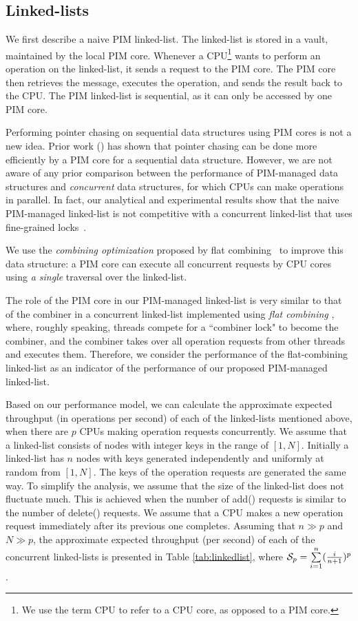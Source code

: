 \subsection{Linked-lists}
\label{section:linked_list}
We first describe a naive PIM linked-list.
The linked-list is stored in a vault, maintained by the local PIM core.
Whenever a CPU\footnote{We use the term CPU to refer to a CPU core, as opposed to a PIM core.} 
wants to perform an operation on the linked-list,
it sends a request to the PIM core.
The PIM core then retrieves the message, executes the operation, and sends the result back to the CPU.
The PIM linked-list is sequential, as it can only be accessed by one PIM core. 

Performing pointer chasing on sequential data structures using PIM cores is not a new idea. 
Prior work (\cite{hsieh2016accelerating, Ahn2015:2, Hashemi:2016}) has shown that 
pointer chasing can be done more efficiently by a PIM core for a sequential data structure.
However, we are not aware of any prior comparison between the performance of
PIM-managed data structures and \emph{concurrent} data structures, 
for which CPUs can make operations in parallel.
In fact, our analytical and experimental results show that 
the naive PIM-managed linked-list is not competitive with 
a concurrent linked-list that uses fine-grained locks~\cite{Heller05}.

We use the \textit{combining optimization} proposed by 
flat combining~\cite{Hendler10} to improve this data structure:
a PIM core can execute all concurrent requests by CPU cores using \emph{a single} 
traversal over the linked-list. 

The role of the PIM core in our PIM-managed linked-list
is very similar to that of the combiner in a concurrent linked-list implemented
using \textit{flat combining} \cite{Hendler10}, where, roughly speaking,
threads compete for a ``combiner lock" to become the combiner, and
the combiner takes over all operation requests from other threads and executes them.
Therefore, we consider the performance of the flat-combining linked-list as an indicator 
of the performance of our proposed PIM-managed linked-list.

Based on our performance model, we can calculate the approximate expected throughput 
(in operations per second) of each of the linked-lists mentioned above, 
when there are $p$ CPUs making operation requests concurrently.
We assume that a linked-list consists of nodes with integer keys in the range of $[1, N]$.
Initially a linked-list has $n$ nodes with keys generated independently
and uniformly at random from $[1, N]$.
The keys of the operation requests are generated the same way.
To simplify the analysis, we assume that the size of the linked-list does not fluctuate much. 
This is achieved when the number of add() requests is similar to the number of delete() requests. 
We assume that a CPU makes a new operation request immediately after
its previous one completes.
Assuming that $n \gg p$ and $N \gg p$, the approximate expected throughput (per second) of each
of the concurrent linked-lists is presented in Table \ref{tab:linkedlist}, 
where $\mathcal{S}_{p} = \sum\limits_{i=1}^{n} ({i \over n+1})^{p}$.

